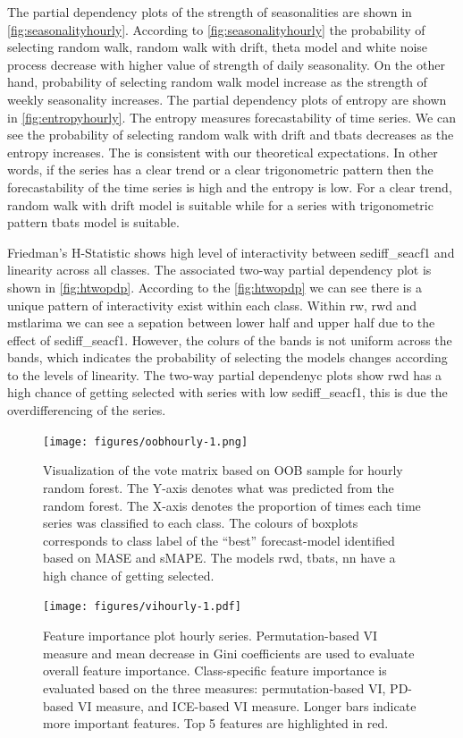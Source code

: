 \documentclass[11pt,a4paper,]{article}
\begin{document}
The partial dependency plots of the strength of seasonalities are shown in \autoref{fig:seasonalityhourly}. According to \autoref{fig:seasonalityhourly} the probability of selecting random walk, random walk with drift, theta model and white noise process decrease with higher value of strength of daily seasonality. On the other hand, probability of selecting random walk model increase as the strength of weekly seasonality increases. The partial dependency plots of entropy are shown in \autoref{fig:entropyhourly}. The entropy measures forecastability of time series. We can see the probability of selecting random walk with drift and tbats decreases as the entropy increases. The is consistent with our theoretical expectations. In other words, if the series has a clear trend or a clear trigonometric pattern then the forecastability of the time series is high and the entropy is low. For a clear trend, random walk with drift model is suitable while for a series with trigonometric pattern tbats model is suitable.

Friedman's H-Statistic shows high level of interactivity between sediff\_seacf1 and linearity across all classes. The associated two-way partial dependency plot is shown in \autoref{fig:htwopdp}. According to the \autoref{fig:htwopdp} we can see there is a unique pattern of interactivity exist within each class. Within rw, rwd and mstlarima we can see a sepation between lower half and upper half due to the effect of sediff\_seacf1. However, the colurs of the bands is not uniform across the bands, which indicates the probability of selecting the models changes according to the levels of linearity. The two-way partial dependenyc plots show rwd has a high chance of getting selected with series with low sediff\_seacf1, this is due the overdifferencing of the series.

\begin{figure}
\centering
\texttt{[image: figures/oobhourly-1.png]}
\caption{\label{fig:oobhourly}Visualization of the vote matrix based on OOB sample for hourly random forest. The Y-axis denotes what was predicted from the random forest. The X-axis denotes the proportion of times each time series was classified to each class. The colours of boxplots corresponds to class label of the ``best'' forecast-model identified based on MASE and sMAPE. The models rwd, tbats, nn have a high chance of getting selected.}
\end{figure}

\begin{figure}
\centering
\texttt{[image: figures/vihourly-1.pdf]}
\caption{\label{fig:vihourly}Feature importance plot hourly series. Permutation-based VI measure and mean decrease in Gini coefficients are used to evaluate overall feature importance. Class-specific feature importance is evaluated based on the three measures: permutation-based VI, PD-based VI measure, and ICE-based VI measure. Longer bars indicate more important features. Top 5 features are highlighted in red.}
\end{figure}
\end{document}
